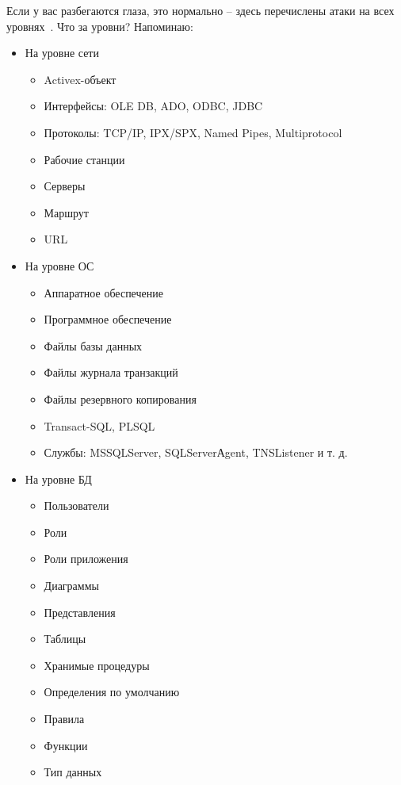 Если у вас разбегаются глаза, это нормально -- здесь перечислены атаки на всех уровнях~\label{pon:urovs}. Что за уровни? Напоминаю:
\begin{itemize}
	\item На уровне сети
	\begin{itemize}
		\item Activex-объект
		\item Интерфейсы: OLE DB, ADO, ODBC, JDBC
		\item Протоколы: TCP/IP, IPX/SPX, Named Pipes, Multiprotocol
		\item Рабочие станции
		\item Серверы
		\item Маршрут
		\item URL
	\end{itemize}
	\item На уровне ОС
	\begin{itemize}
		\item Аппаратное обеспечение
		\item Программное обеспечение
		\item Файлы базы данных
		\item Файлы журнала транзакций
		\item Файлы резервного копирования
		\item Transact-SQL, PLSQL
		\item Службы: MSSQLServer, SQLServerАgent, TNSListener и т. д.
	\end{itemize}
	\item На уровне БД
	\begin{itemize}
		\item Пользователи
		\item Роли
		\item Роли приложения
		\item Диаграммы
		\item Представления
		\item Таблицы
		\item Хранимые процедуры
		\item Определения по умолчанию
		\item Правила
		\item Функции
		\item Тип данных
	\end{itemize}
\end{itemize}

